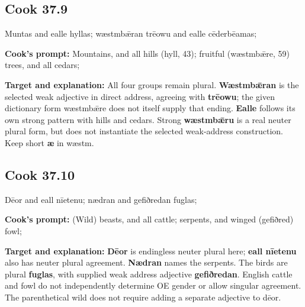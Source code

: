 \par\begin{minipage}{\linewidth}\raggedright
\subsection*{Cook 37.9}

Muntas and ealle hyllas; wæstmbǣran trēowu and ealle cēderbēamas;

\textbf{Cook's prompt:} Mountains, and all hills (hyll, 43); fruitful (wæstmbǣre, 59) trees, and all cedars;

\textbf{Target and explanation:} All four groups remain plural. \textbf{Wæstmbǣran} is the selected weak adjective in direct address, agreeing with \textbf{trēowu}; the given dictionary form wæstmbǣre does not itself supply that ending. \textbf{Ealle} follows its own strong pattern with hills and cedars. Strong \textbf{wæstmbǣru} is a real neuter plural form, but does not instantiate the selected weak-address construction. Keep short \textbf{æ} in wæstm.

\end{minipage}\par\addvspace{4pt}

\par\begin{minipage}{\linewidth}\raggedright
\subsection*{Cook 37.10}

Dēor and eall nīetenu; nædran and gefiðredan fuglas;

\textbf{Cook's prompt:} (Wild) beasts, and all cattle; serpents, and winged (gefiðred) fowl;

\textbf{Target and explanation:} \textbf{Dēor} is endingless neuter plural here; \textbf{eall nīetenu} also has neuter plural agreement. \textbf{Nædran} names the serpents. The birds are plural \textbf{fuglas}, with supplied weak address adjective \textbf{gefiðredan}. English cattle and fowl do not independently determine OE gender or allow singular agreement. The parenthetical wild does not require adding a separate adjective to dēor.

\end{minipage}\par\addvspace{4pt}

